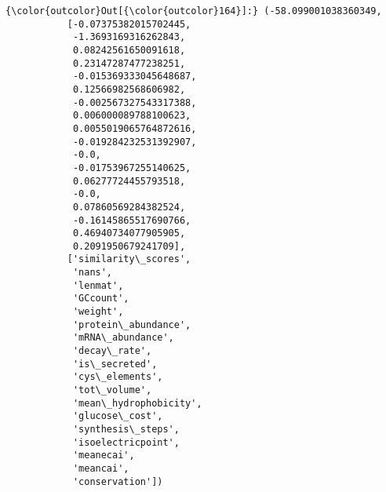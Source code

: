 \documentclass[11pt]{article}
\begin{document}
\begin{Verbatim}[commandchars=\\\{\}]
{\color{outcolor}Out[{\color{outcolor}164}]:} (-58.099001038360349,
           [-0.07375382015702445,
            -1.3693169316262843,
            0.08242561650091618,
            0.23147287477238251,
            -0.015369333045648687,
            0.12566982568606982,
            -0.002567327543317388,
            0.006000089788100623,
            0.0055019065764872616,
            -0.019284232531392907,
            -0.0,
            -0.01753967255140625,
            0.06277724455793518,
            -0.0,
            0.07860569284382524,
            -0.16145865517690766,
            0.46940734077905905,
            0.2091950679241709],
           ['similarity\_scores',
            'nans',
            'lenmat',
            'GCcount',
            'weight',
            'protein\_abundance',
            'mRNA\_abundance',
            'decay\_rate',
            'is\_secreted',
            'cys\_elements',
            'tot\_volume',
            'mean\_hydrophobicity',
            'glucose\_cost',
            'synthesis\_steps',
            'isoelectricpoint',
            'meanecai',
            'meancai',
            'conservation'])
\end{Verbatim}
            

    
    
    
    
\end{document}
